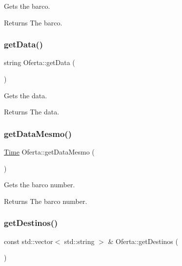 Gets the barco. 

\begin{DoxyReturn}{Returns}
The barco. 
\end{DoxyReturn}
\mbox{\label{classOferta_a2b156b75371ad59af54ad96ad79c9d1e}} 
\subsubsection{\texorpdfstring{get\+Data()}{getData()}}
{\footnotesize\ttfamily string Oferta\+::get\+Data (\begin{DoxyParamCaption}{ }\end{DoxyParamCaption})}



Gets the data. 

\begin{DoxyReturn}{Returns}
The data. 
\end{DoxyReturn}
\mbox{\label{classOferta_a13ebfcae88d39a90f0c66368534ed335}} 
\subsubsection{\texorpdfstring{get\+Data\+Mesmo()}{getDataMesmo()}}
{\footnotesize\ttfamily \hyperlink{classTime}{Time} Oferta\+::get\+Data\+Mesmo (\begin{DoxyParamCaption}{ }\end{DoxyParamCaption})\hspace{0.3cm}{\ttfamily [inline]}}



Gets the barco number. 

\begin{DoxyReturn}{Returns}
The barco number. 
\end{DoxyReturn}
\mbox{\label{classOferta_a746c91e5db19098d211a3f6bde2ec8ec}} 
\subsubsection{\texorpdfstring{get\+Destinos()}{getDestinos()}}
{\footnotesize\ttfamily const std\+::vector$<$ std\+::string $>$ \& Oferta\+::get\+Destinos (\begin{DoxyParamCaption}{ }\end{DoxyParamCaption})}



